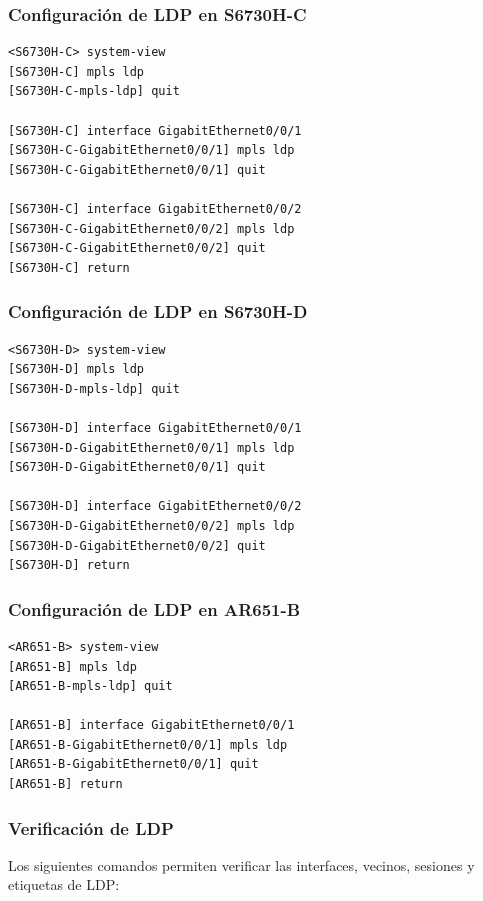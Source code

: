 \subsubsection{Configuración de LDP en S6730H-C}

\begin{lstlisting}[style=terminal]
<S6730H-C> system-view
[S6730H-C] mpls ldp
[S6730H-C-mpls-ldp] quit

[S6730H-C] interface GigabitEthernet0/0/1
[S6730H-C-GigabitEthernet0/0/1] mpls ldp
[S6730H-C-GigabitEthernet0/0/1] quit

[S6730H-C] interface GigabitEthernet0/0/2
[S6730H-C-GigabitEthernet0/0/2] mpls ldp
[S6730H-C-GigabitEthernet0/0/2] quit
[S6730H-C] return
\end{lstlisting}

\subsubsection{Configuración de LDP en S6730H-D}

\begin{lstlisting}[style=terminal]
<S6730H-D> system-view
[S6730H-D] mpls ldp
[S6730H-D-mpls-ldp] quit

[S6730H-D] interface GigabitEthernet0/0/1
[S6730H-D-GigabitEthernet0/0/1] mpls ldp
[S6730H-D-GigabitEthernet0/0/1] quit

[S6730H-D] interface GigabitEthernet0/0/2
[S6730H-D-GigabitEthernet0/0/2] mpls ldp
[S6730H-D-GigabitEthernet0/0/2] quit
[S6730H-D] return
\end{lstlisting}

\subsubsection{Configuración de LDP en AR651-B}

\begin{lstlisting}[style=terminal]
<AR651-B> system-view
[AR651-B] mpls ldp
[AR651-B-mpls-ldp] quit

[AR651-B] interface GigabitEthernet0/0/1
[AR651-B-GigabitEthernet0/0/1] mpls ldp
[AR651-B-GigabitEthernet0/0/1] quit
[AR651-B] return
\end{lstlisting}

\subsubsection{Verificación de LDP}

Los siguientes comandos permiten verificar las interfaces, vecinos, sesiones
y etiquetas de LDP:

